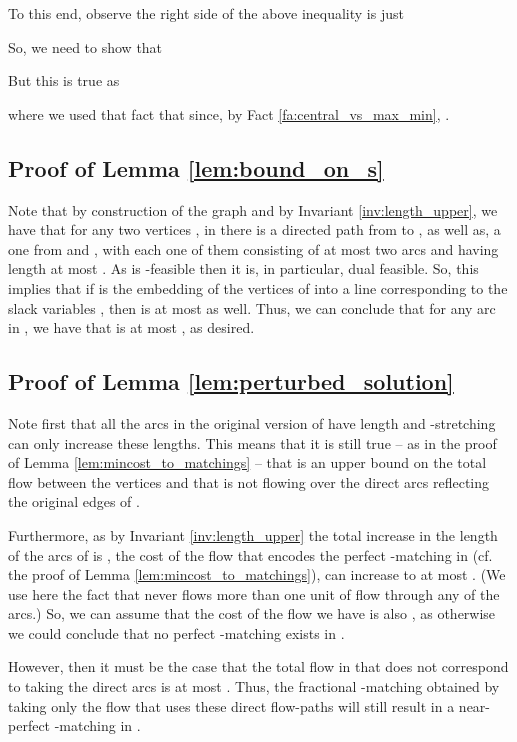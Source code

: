 \documentclass[11pt, letterpaper]{article}
\begin{document}
To this end, observe the right side of the above inequality is just


So, we need to show that 



But this is true as 

where we used that fact that  since, by Fact \ref{fa:central_vs_max_min}, . 

\subsection{Proof of Lemma \ref{lem:bound_on_s}}\label{app:bound_on_s}


Note that by construction of the graph  and by Invariant \ref{inv:length_upper}, we have that for any two vertices ,  in  there is a directed path from  to , as well as, a one from  and , with each one of them consisting of at most two arcs and having length at most . As  is -feasible then it is, in particular, dual feasible. So, this implies that if  is the embedding of the vertices of  into a line corresponding to the slack variables , then  is at most  as well. Thus, we can conclude that for any arc  in , we have that  is at most , as desired.


\subsection{Proof of Lemma \ref{lem:perturbed_solution}}\label{app:perturbed_solution}


Note first that all the arcs in the original version of  have length  and -stretching can only increase these lengths. This means that it is still true -- as in the proof of Lemma \ref{lem:mincost_to_matchings} -- that  is an upper bound on the total flow between the vertices  and  that is not flowing over the direct arcs  reflecting the original edges of . 

Furthermore, as by Invariant \ref{inv:length_upper} the total increase in the length of the arcs of  is , the cost  of the flow that encodes the perfect -matching in  (cf. the proof of Lemma \ref{lem:mincost_to_matchings}), can increase to at most . (We use here the fact that  never flows more than one unit of flow through any of the arcs.) So, we can assume that the cost  of the flow  we have is also , as otherwise we could conclude that no perfect -matching exists in . 

However, then it must be the case that the total flow in  that does not correspond to taking the direct arcs is at most . Thus, the fractional -matching obtained by taking only the flow that uses these direct flow-paths will still result in a near-perfect -matching in . 
\end{document}
